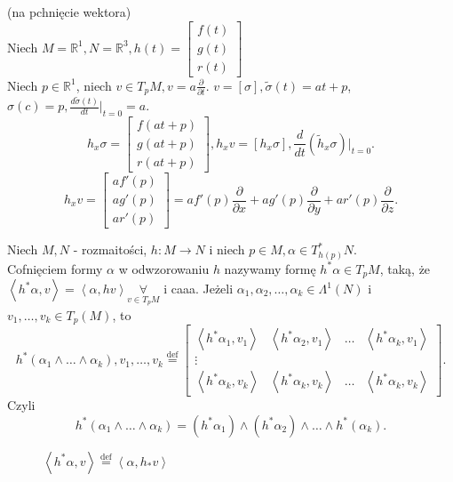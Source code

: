 \documentclass[../main.tex]{subfiles}
\begin{document}
    \begin{przyklad}
        (na pchnięcie wektora)\\
        Niech $M = \mathbb{R}^1, N=\mathbb{R}^3, h(t) = \begin{bmatrix} f(t)\\g(t)\\r(t) \end{bmatrix} $\\
        Niech $p\in \mathbb{R}^1$, niech $v\in T_pM, v = a \frac{\partial }{\partial t} $. $v = [\sigma], \tilde \sigma(t) = at+p$, $\sigma(c) = p, \frac{d \tilde \sigma(t)}{dt}\vert_{t=0} = a$.\\
        \[
            h_x \sigma = \begin{bmatrix} f(at+p)\\g(at+p)\\r(at+p) \end{bmatrix}, h_x v = [h_x \sigma], \frac{d}{dt}(\tilde h_x \sigma)\vert_{t=0}
        .\]
        \[
            h_xv = \begin{bmatrix} af'(p)\\ ag'(p) \\ ar'(p) \end{bmatrix} = af'(p) \frac{\partial }{\partial x} + ag'(p) \frac{\partial }{\partial y} + ar'(p) \frac{\partial }{\partial z}
        .\]
    \end{przyklad}
    \begin{figure}[h]
        \centering
        \label{fig:fig_57}
    \end{figure}
    \begin{definicja}
    Niech $M, N$ - rozmaitości, $h: M\to N$ i niech $p\in M, \alpha\in T^*_{h(p)}N$.\\
    Cofnięciem formy $\alpha$ w odwzorowaniu $h$ nazywamy formę $h^*\alpha \in T_pM$, taką, że $\left<h^*\alpha,v \right> = \left<\alpha,hv \right>\underset{v\in T_pM}{\forall} $ i caaa. Jeżeli $\alpha_1,\alpha_2,\ldots,\alpha_k \in \Lambda^1(N)$ i $v_1,\ldots,v_k\in T_p(M)$, to
    \[
        h^*(\alpha_1\land\ldots\land\alpha_k), v_1,\ldots,v_k \overset{\text{def}}{=} \begin{bmatrix} \left<h^*\alpha_1,v_1 \right>&\left<h^*\alpha_2,v_1 \right>&\ldots&\left<h^*\alpha_k,v_1 \right> \\
            \vdots &&&\\
            \left<h^*\alpha_k,v_k \right>&\left<h^*\alpha_k, v_k \right>&\ldots&\left<h^*\alpha_k,v_k \right>
        \end{bmatrix}
    .\]
    Czyli
    \[
        h^*(\alpha_1\land\ldots\land\alpha_k) = (h^*\alpha_1)\land(h^*\alpha_2)\land\ldots\land h^*(\alpha_k)
    .\]
    \end{definicja}
    \begin{figure}[h]
        \centering
        \caption{$\left<h^*\alpha,v \right> \overset{\text{def}}{=}  \left<\alpha, h_*v \right>$}
        \label{fig:fig_58}
    \end{figure}
\end{document}
